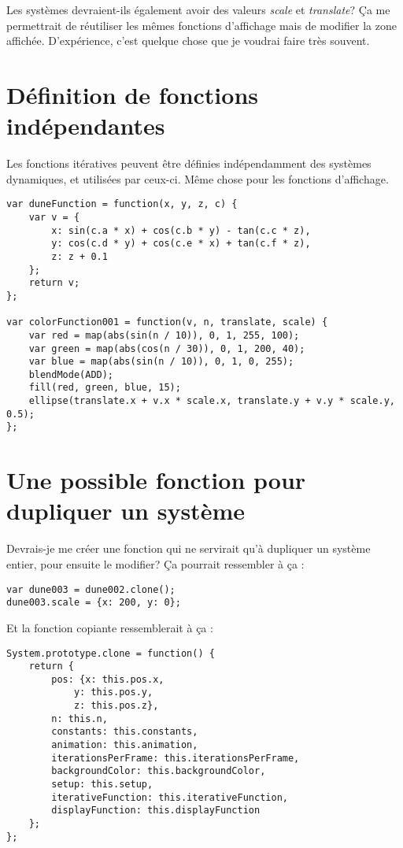 Les systèmes devraient-ils également avoir des valeurs \textit{scale} et \textit{translate}? Ça me permettrait de réutiliser les mêmes fonctions d'affichage mais de modifier la zone affichée. D'expérience, c'est quelque chose que je voudrai faire très souvent.

\newpage
\section{Définition de fonctions indépendantes}
Les fonctions itératives peuvent être définies indépendamment des systèmes dynamiques, et utilisées par ceux-ci. Même chose pour les fonctions d'affichage.
\begin{lstlisting}
var duneFunction = function(x, y, z, c) {
    var v = {
        x: sin(c.a * x) + cos(c.b * y) - tan(c.c * z),
        y: cos(c.d * y) + cos(c.e * x) + tan(c.f * z),
        z: z + 0.1
    };
    return v;
};

var colorFunction001 = function(v, n, translate, scale) {
    var red = map(abs(sin(n / 10)), 0, 1, 255, 100);
    var green = map(abs(cos(n / 30)), 0, 1, 200, 40);
    var blue = map(abs(sin(n / 10)), 0, 1, 0, 255);
    blendMode(ADD);
    fill(red, green, blue, 15);
    ellipse(translate.x + v.x * scale.x, translate.y + v.y * scale.y, 0.5);
};
\end{lstlisting}
\newpage
\section{Une possible fonction pour dupliquer un système}
Devrais-je me créer une fonction qui ne servirait qu'à dupliquer un système entier, pour ensuite le modifier? Ça pourrait ressembler à ça :

\begin{lstlisting}
var dune003 = dune002.clone();
dune003.scale = {x: 200, y: 0};
\end{lstlisting}

Et la fonction copiante ressemblerait à ça :
\begin{lstlisting}
System.prototype.clone = function() {
    return {
        pos: {x: this.pos.x, 
            y: this.pos.y, 
            z: this.pos.z},
        n: this.n,
        constants: this.constants,
        animation: this.animation,
        iterationsPerFrame: this.iterationsPerFrame,
        backgroundColor: this.backgroundColor,
        setup: this.setup,
        iterativeFunction: this.iterativeFunction,
        displayFunction: this.displayFunction
    };
};
\end{lstlisting}